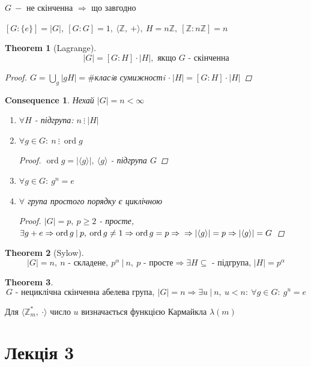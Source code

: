 \documentclass[a4paper,12pt, centered]{bookest}
\newtheorem{theorem}{Theorem}[section]
\newtheorem*{cons*}{Consequence}
\DeclareMathOperator{\ord}{ord}
\begin{document}
$G\>- $ не скінченна $\Rightarrow$ що завгодно
\begin{example}
	$[G:\{e\}]=|G|,\>[G:G]=1,\>\langle\mathbb{Z},\>+\rangle,\>H=n\mathbb{Z},\>[\mathbb{Z}:n\mathbb{Z}]=n$
\end{example}
\begin{theorem}[Lagrange]
	$$|G|=[G:H]\cdot|H|,\textrm{ якщо } G\textrm{ - скінченна}$$
	\begin{proof}
	$G=\bigcup\limits_{g}|gH|=\#$класiв сумижностi $\cdot\>|H|=[G:H]\cdot|H|$
\end{proof}
\end{theorem}
\begin{cons*}Нехай $|G|=n<\infty$
	\begin{enumerate}
		\item $\forall H$ - підгрупа: $n\>\vdots\>|H|$
		\item $\forall g\in G:\>n\>\vdots\>\ord g$ \begin{proof}
			$\ord g=|\langle g\rangle|,\>\langle g\rangle$ - підгрупа $G$
		\end{proof}
		\item $\forall g\in G:\>g^n=e$
		\item $\forall$ група простого порядку є циклічною\begin{proof}
			$|G|=p,\>p\geq 2$ - просте, $\exists g+e\Rightarrow\ord g\>|\>p,\>\ord g\neq1\Rightarrow\ord g=p\Rightarrow\\\Rightarrow|\langle g\rangle|=p\Rightarrow |\langle g\rangle|=G$
		\end{proof}
	\end{enumerate}
\end{cons*}
\begin{theorem}[Sylow]
	$$|G|=n,\>n\textrm{ - складене},\>p^\alpha\>|\>n,\>p\textrm{ - просте}\Rightarrow\exists H\subseteq\textrm{ - підгрупа, }|H|=p^\alpha$$
\end{theorem}
\begin{theorem}
	$$G\textrm{ - нециклічна скінченна абелева група},\>|G|=n\Rightarrow\exists u\>|\>n,\>u<n:\>\forall g\in G:\>g^u=e$$
\end{theorem}
Для $\langle\mathbb{Z}_m^*,\>\cdot \rangle$ число $u$ визначається функцією Кармайкла $\lambda(m)$
\chapter{Лекція 3}
\end{document}
